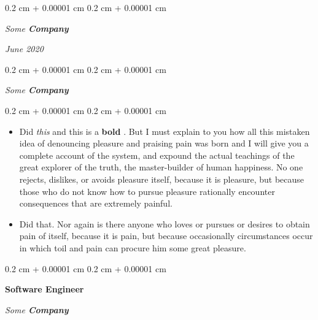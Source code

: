 \documentclass[10pt, letterpaper]{article}
\newenvironment{highlights}{
    \begin{itemize}[
        topsep=0.10 cm,
        parsep=0.10 cm,
        partopsep=0pt,
        itemsep=0pt,
        leftmargin=0.4 cm + 10pt
    ]
}{
    \end{itemize}
} %
\newenvironment{onecolentry}{
    \begin{adjustwidth}{
        0.2 cm + 0.00001 cm
    }{
        0.2 cm + 0.00001 cm
    }
}{
    \end{adjustwidth}
} %
\newenvironment{twocolentry}[2][]{
    \onecolentry
    \def\secondColumn{#2}
    \setcolumnwidth{\fill, 4.5 cm}
    \begin{paracol}{2}
}{
    \switchcolumn \raggedleft \secondColumn
    \end{paracol}
    \endonecolentry
} %
\let\hrefWithoutArrow\href
\renewcommand{\href}[2]{\hrefWithoutArrow{#1}{\ifthenelse{\equal{#2}{}}{ }{#2 }\raisebox{.15ex}{\footnotesize \faExternalLink*}}}
\begin{document}
        \vspace{0.2 cm}

            \begin{twocolentry}{


        \textit{June 2020}    }
                \textbf{}

                \textit{Some \textbf{Company}}
            \end{twocolentry}



        \vspace{0.2 cm}

            \begin{onecolentry}
                \textbf{}

                \textit{Some \textbf{Company}}
            \end{onecolentry}

        \vspace{0.10 cm}
        \begin{onecolentry}
            \begin{highlights}
                \item Did \textit{this} and this is a \textbf{bold} \href{https://example.com}{link}. But I must explain to you how all this mistaken idea of denouncing pleasure and praising pain was born and I will give you a complete account of the system, and expound the actual teachings of the great explorer of the truth, the master-builder of human happiness. No one rejects, dislikes, or avoids pleasure itself, because it is pleasure, but because those who do not know how to pursue pleasure rationally encounter consequences that are extremely painful.
                \item Did that. Nor again is there anyone who loves or pursues or desires to obtain pain of itself, because it is pain, but because occasionally circumstances occur in which toil and pain can procure him some great pleasure.
            \end{highlights}
        \end{onecolentry}


        \vspace{0.2 cm}

            \begin{onecolentry}
                \textbf{Software Engineer}

                \textit{Some \textbf{Company}}
            \end{onecolentry}
\end{document}
